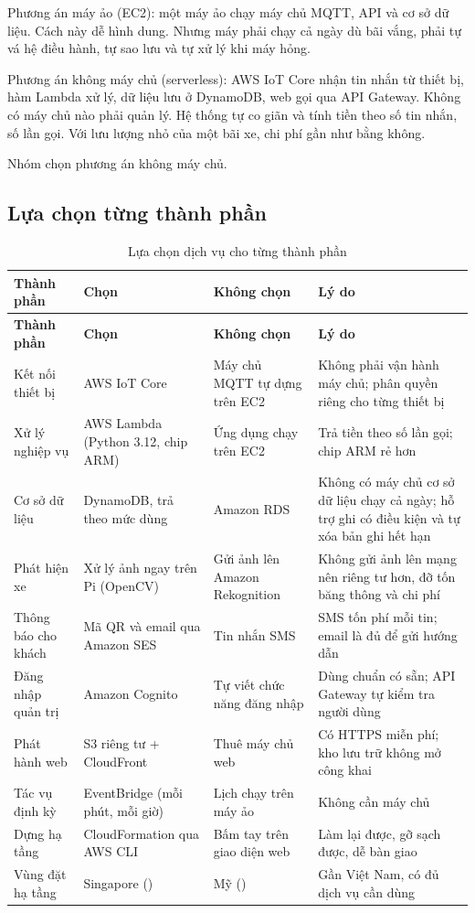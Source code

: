 Phương án máy ảo (EC2): một máy ảo chạy máy chủ MQTT, API và cơ sở dữ liệu. Cách này dễ hình dung. Nhưng máy phải chạy cả ngày dù bãi vắng, phải tự vá hệ điều hành, tự sao lưu và tự xử lý khi máy hỏng.

Phương án không máy chủ (serverless): AWS IoT Core nhận tin nhắn từ thiết bị, hàm Lambda xử lý, dữ liệu lưu ở DynamoDB, web gọi qua API Gateway. Không có máy chủ nào phải quản lý. Hệ thống tự co giãn và tính tiền theo số tin nhắn, số lần gọi. Với lưu lượng nhỏ của một bãi xe, chi phí gần như bằng không.

Nhóm chọn phương án không máy chủ.

\subsection{Lựa chọn từng thành phần}

\begin{longtable}{@{}P{2.8cm}P{3.6cm}P{3.2cm}P{4.6cm}@{}}
\caption{Lựa chọn dịch vụ cho từng thành phần}\label{tab:quyetdinh}\\
\toprule
\textbf{Thành phần} & \textbf{Chọn} & \textbf{Không chọn} & \textbf{Lý do} \\ \midrule
\endfirsthead
\toprule
\textbf{Thành phần} & \textbf{Chọn} & \textbf{Không chọn} & \textbf{Lý do} \\ \midrule
\endhead
Kết nối thiết bị & AWS IoT Core & Máy chủ MQTT tự dựng trên EC2 & Không phải vận hành máy chủ; phân quyền riêng cho từng thiết bị \\
Xử lý nghiệp vụ & AWS Lambda (Python 3.12, chip ARM) & Ứng dụng chạy trên EC2 & Trả tiền theo số lần gọi; chip ARM rẻ hơn \\
Cơ sở dữ liệu & DynamoDB, trả theo mức dùng & Amazon RDS & Không có máy chủ cơ sở dữ liệu chạy cả ngày; hỗ trợ ghi có điều kiện và tự xóa bản ghi hết hạn \\
Phát hiện xe & Xử lý ảnh ngay trên Pi (OpenCV) & Gửi ảnh lên Amazon Rekognition & Không gửi ảnh lên mạng nên riêng tư hơn, đỡ tốn băng thông và chi phí \\
Thông báo cho khách & Mã QR và email qua Amazon SES & Tin nhắn SMS & SMS tốn phí mỗi tin; email là đủ để gửi hướng dẫn \\
Đăng nhập quản trị & Amazon Cognito & Tự viết chức năng đăng nhập & Dùng chuẩn có sẵn; API Gateway tự kiểm tra người dùng \\
Phát hành web & S3 riêng tư + CloudFront & Thuê máy chủ web & Có HTTPS miễn phí; kho lưu trữ không mở công khai \\
Tác vụ định kỳ & EventBridge (mỗi phút, mỗi giờ) & Lịch chạy trên máy ảo & Không cần máy chủ \\
Dựng hạ tầng & CloudFormation qua AWS CLI & Bấm tay trên giao diện web & Làm lại được, gỡ sạch được, dễ bàn giao \\
Vùng đặt hạ tầng & Singapore () & Mỹ () & Gần Việt Nam, có đủ dịch vụ cần dùng \\
\bottomrule
\end{longtable}

